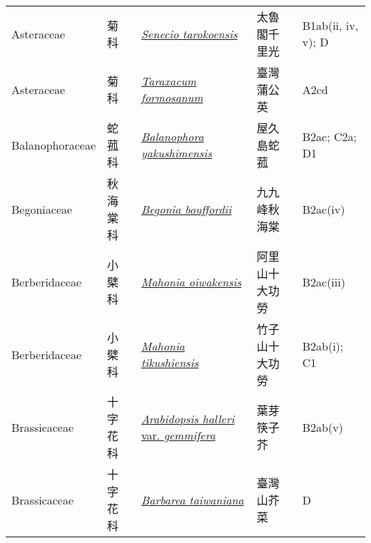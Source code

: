 {\begin{longtable}{L{2.5cm}L{2cm}L{5cm}L{2.5cm}L{3cm}}
    Asteraceae & 菊科 & \href{http://www.theplantlist.org/tpl1.1/search?q=Senecio+tarokoensis}{\textit{Senecio tarokoensis} } & 太魯閣千里光 & B1ab(ii, iv, v); D    \\
    Asteraceae & 菊科 & \href{http://www.theplantlist.org/tpl1.1/search?q=Taraxacum+formosanum}{\textit{Taraxacum formosanum} } & 臺灣蒲公英 & A2cd    \\
    Balanophoraceae & 蛇菰科 & \href{http://www.theplantlist.org/tpl1.1/search?q=Balanophora+yakushimensis}{\textit{Balanophora yakushimensis} } & 屋久島蛇菰 & B2ac; C2a; D1    \\
    Begoniaceae & 秋海棠科 & \href{http://www.theplantlist.org/tpl1.1/search?q=Begonia+bouffordii}{\textit{Begonia bouffordii} } & 九九峰秋海棠 & B2ac(iv)    \\
    Berberidaceae & 小檗科 & \href{http://www.theplantlist.org/tpl1.1/search?q=Mahonia+oiwakensis}{\textit{Mahonia oiwakensis} } & 阿里山十大功勞 & B2ac(iii)    \\
    Berberidaceae & 小檗科 & \href{http://www.theplantlist.org/tpl1.1/search?q=Mahonia+tikushiensis}{\textit{Mahonia tikushiensis} } & 竹子山十大功勞 & B2ab(i); C1    \\
    Brassicaceae & 十字花科 & \href{http://www.theplantlist.org/tpl1.1/search?q=Arabidopsis+halleri+var.+gemmifera}{\textit{Arabidopsis halleri} var. \textit{gemmifera} } & 葉芽筷子芥 & B2ab(v)    \\
    Brassicaceae & 十字花科 & \href{http://www.theplantlist.org/tpl1.1/search?q=Barbarea+taiwaniana}{\textit{Barbarea taiwaniana} } & 臺灣山芥菜 & D    \\

\end{longtable}}

